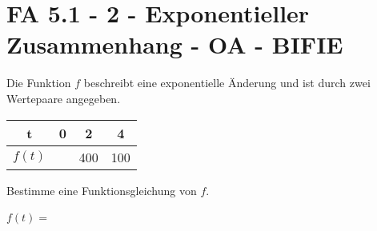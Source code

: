 \section{FA 5.1 - 2 - Exponentieller Zusammenhang - OA - BIFIE}


\begin{beispiel}[FA 5.1]{1} %
Die Funktion $f$ beschreibt eine exponentielle Änderung und ist durch zwei Wertepaare angegeben. \leer

\begin{center}
\begin{tabular}{|c|c|c|c|} \hline
\cellcolor{light-gray} t & 0 & 2 & 4 \\ \hline
\cellcolor{light-gray} $f(t)$ &  & 400 & 100 \\ \hline
\end{tabular}
\end{center}

Bestimme eine Funktionsgleichung von $f$.

\leer

$f(t)=$\,
\end{beispiel}